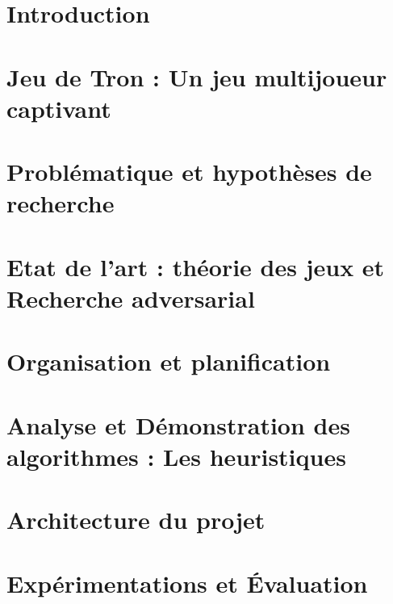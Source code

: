 \documentclass[a4paper,12pt]{article}
\begin{document}

\setcounter{page}{1}
\section*{Introduction}
\label{sec:intro}


\newpage
\section[Jeu de Tron]{Jeu de Tron : Un jeu multijoueur captivant}
\label{sec:jeu_tron}


\section{Problématique et hypothèses de recherche}
\label{sec:problematique}


\section{Etat de l'art : théorie des jeux et Recherche adversarial}
\label{sec:etat_art}



\section{Organisation et planification}
\label{sec:organisation}


\section[Analyse et Démonstration des algorithmes]{Analyse et Démonstration des algorithmes : Les heuristiques}
\label{sec:analyse}


\section{Architecture du projet}
\label{sec:architecture}


\section{Expérimentations et Évaluation}

\end{document}
